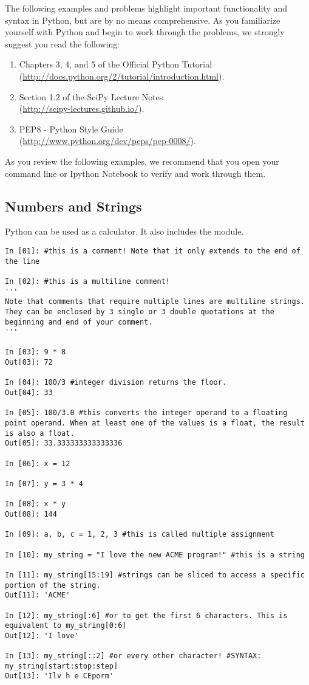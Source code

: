 The following examples and problems highlight important functionality
and syntax in Python, but are by no means comprehensive.
As you familiarize yourself with Python and begin to work through the problems,  we strongly suggest you read the following:
\begin{enumerate}
\item Chapters 3, 4, and 5 of the Official Python Tutorial \\
        (\url{http://docs.python.org/2/tutorial/introduction.html}).
\item Section 1.2 of the SciPy Lecture Notes \\
        (\url{http://scipy-lectures.github.io/}).
\item PEP8 - Python Style Guide \\
        (\url{http://www.python.org/dev/peps/pep-0008/}).
\end{enumerate}


As you review the following examples, we recommend that you open your command line or Ipython Notebook to verify and work through them.

\subsection*{Numbers and Strings}

\begin{example}
Python can be used as a calculator. It also 
includes the  module.

\begin{lstlisting}
In [01]: #this is a comment! Note that it only extends to the end of the line

In [02]: #this is a multiline comment!
''' 
Note that comments that require multiple lines are multiline strings.
They can be enclosed by 3 single or 3 double quotations at the beginning and end of your comment. 
'''

In [03]: 9 * 8
Out[03]: 72

In [04]: 100/3 #integer division returns the floor.
Out[04]: 33

In [05]: 100/3.0 #this converts the integer operand to a floating point operand. When at least one of the values is a float, the result is also a float. 
Out[05]: 33.333333333333336

In [06]: x = 12

In [07]: y = 3 * 4

In [08]: x * y
Out[08]: 144

In [09]: a, b, c = 1, 2, 3 #this is called multiple assignment

In [10]: my_string = "I love the new ACME program!" #this is a string

In [11]: my_string[15:19] #strings can be sliced to access a specific portion of the string.
Out[11]: 'ACME'

In [12]: my_string[:6] #or to get the first 6 characters. This is equivalent to my_string[0:6]
Out[12]: 'I love'

In [13]: my_string[::2] #or every other character! #SYNTAX: my_string[start:stop:step]
Out[13]: 'Ilv h e CEporm'

\end{lstlisting}
\end{example}


